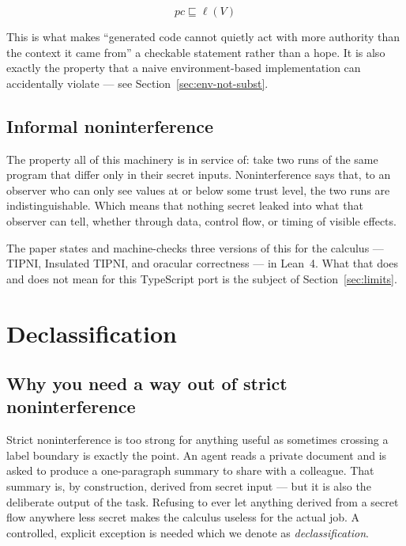\documentclass[11pt, a4paper]{article}
\newcommand{\flowsto}{\sqsubseteq}
\begin{document}
\[
pc \flowsto \ell(V)
\]

This is what makes ``generated code cannot quietly act with more authority than
the context it came from'' a checkable statement rather than a hope. It is also
exactly the property that a naive environment-based implementation can
accidentally violate --- see Section~\ref{sec:env-not-subst}.

\subsection{Informal noninterference}
\label{sec:noninterference}

The property all of this machinery is in service of: take two runs of the same
program that differ only in their secret inputs. Noninterference says that, to
an observer who can only see values at or below some trust level, the two runs
are indistinguishable. Which means that nothing secret leaked into what that
observer can tell, whether through data, control flow, or timing of visible
effects. 

The paper states and machine-checks three versions of this for the calculus ---
TIPNI, Insulated TIPNI, and oracular correctness --- in Lean~4. What that does
and does not mean for this TypeScript port is the subject of
Section~\ref{sec:limits}.

\section{Declassification}

\subsection{Why you need a way out of strict noninterference}
\label{sec:failures}

Strict noninterference is too strong for anything useful as sometimes
crossing a label boundary is exactly the point. An agent reads a private
document and is asked to produce a one-paragraph summary to share with a
colleague. That summary is, by construction, derived from secret input
--- but it is also the deliberate output of the task. Refusing to ever let
anything derived from a secret flow anywhere less secret makes the
calculus useless for the actual job. A controlled, explicit exception is
needed which we denote as \emph{declassification}.
\end{document}
